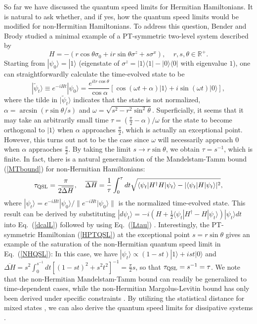 \documentclass{tADP2e}
\theoremstyle{plain}
\theoremstyle{plain}
\theoremstyle{definition}
\begin{document}
So far we have discussed the quantum speed limits for Hermitian Hamiltonians. It is natural to ask whether, and if yes, how the quantum speed limits would be modified for non-Hermitian Hamiltonians. To address this question, Bender and Brody studied a minimal example of a PT-symmetric two-level system described by \cite{BCM09}
\begin{equation}
H=-(r\cos\theta \sigma_0+ir\sin\theta \sigma^z+s\sigma^x),\;\;\;\;r,s,\theta\in\mathbb{R}^+.
\label{HPTQSL}
\end{equation} 
Starting from $|\psi_0\rangle=|1\rangle$ (eigenstate of $\sigma^z=|1\rangle\langle 1|-|0\rangle\langle 0|$ with eigenvalue $1$), one can straightforwardly calculate the time-evolved state to be
\begin{equation}
|\tilde\psi_t\rangle\equiv e^{-iHt}|\psi_0\rangle=\frac{e^{itr\cos\theta}}{\cos\alpha}[\cos(\omega t+\alpha)|1\rangle+i\sin(\omega t)|0\rangle],
\end{equation}
where the tilde in $|\tilde\psi_t\rangle$ indicates that the state is not normalized, $\alpha=\arcsin(r\sin\theta/s)$ and $\omega=\sqrt{s^2-r^2\sin^2\theta}$. Superficially, it seems that it may take an arbitrarily small time $\tau=(\frac{\pi}{2}-\alpha)/\omega$ for the state to become orthogonal to $|1\rangle$ when $\alpha$ approaches $\frac{\pi}{2}$, which is actually an exceptional point. However, this turns out not to be the case since $\omega$ will necessarily approach $0$ when $\alpha$ appraoches $\frac{\pi}{2}$. By taking the limit $s\to r\sin\theta$, we obtain $\tau=s^{-1}$, which is finite. In fact, there is a natural generalization of the Mandelstam-Tamm bound (\ref{MTbound}) for non-Hermitian Hamiltonians:
\begin{equation}
\tau_{\rm QSL}=\frac{\pi}{2\overline{\Delta H}},\;\;\;\;\overline{\Delta H}=\frac{1}{\tau}\int^\tau_0dt\sqrt{\langle\psi_t| H^\dag H|\psi_t\rangle-|\langle\psi_t| H|\psi_t\rangle|^2},
\label{NHQSL}
\end{equation}
where $|\psi_t\rangle=e^{-iHt}|\psi_0\rangle/\|e^{-iHt}|\psi_0\rangle\|$ is the normalized time-evolved state. This result can be derived by substituting $|d\psi_t\rangle=-i(H+\frac{1}{2}\langle\psi_t|H^\dag -H|\psi_t\rangle)|\psi_t\rangle dt$ into Eq.~(\ref{dcalL}) followed by using Eq.~(\ref{Ltau}) \cite{RU12}. Interestingly, the PT-symmetric Hamiltonian (\ref{HPTQSL}) at the exceptional point $s=r\sin\theta$ gives an example of the saturation of the non-Hermitian quantum speed limit in Eq.~(\ref{NHQSL}): In this case, we have $|\psi_t\rangle\propto (1-st)|1\rangle+ist|0\rangle$ and $\overline{\Delta H}=s^2\int^{s^{-1}}_{0}dt[(1-st)^2+s^2t^2]^{-1}=\frac{\pi}{2}s$, so that $\tau_{\rm QSL}=s^{-1}=\tau$. We note that the non-Hermitian Mandelstam-Tamm bound can readily be generalized to time-dependent cases, while the non-Hermitian Margolus-Levitin bound has only been derived under specific constraints \cite{SS19}. 
By utilizing the statistical distance for mixed states \cite{BSL94}, we can also derive the quantum speed limits for dissipative systems \cite{DS13,PDP16,KF19}.
 
\end{document}
